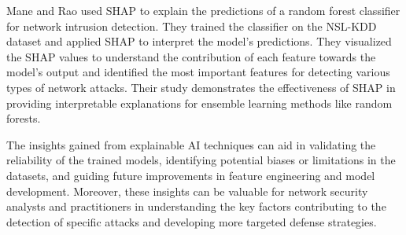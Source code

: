 Mane and Rao \cite{mane2021explaining} used SHAP to explain the predictions of a random forest classifier for network intrusion detection. They trained the classifier on the NSL-KDD dataset and applied SHAP to interpret the model's predictions. They visualized the SHAP values to understand the contribution of each feature towards the model's output and identified the most important features for detecting various types of network attacks. Their study demonstrates the effectiveness of SHAP in providing interpretable explanations for ensemble learning methods like random forests.

The insights gained from explainable AI techniques can aid in validating the reliability of the trained models, identifying potential biases or limitations in the datasets, and guiding future improvements in feature engineering and model development. Moreover, these insights can be valuable for network security analysts and practitioners in understanding the key factors contributing to the detection of specific attacks and developing more targeted defense strategies.